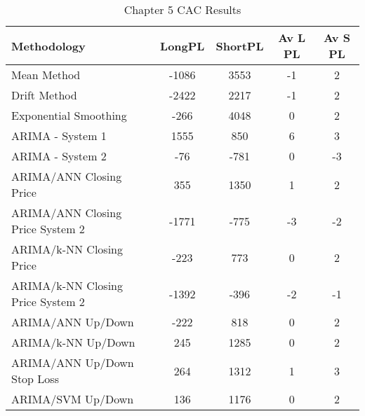 \begin{table}[ht]
\centering
\caption[Chapter 5 CAC Results]{Chapter 5 CAC Results} 
\label{tab:chp6:cac2_summary}
\begin{tabular}{lcccc}
  \toprule Methodology & LongPL & ShortPL & Av L PL & Av S PL \\ 
  \midrule Mean Method & -1086 & 3553 & -1 & 2 \\ 
  Drift Method & -2422 & 2217 & -1 & 2 \\ 
  Exponential Smoothing & -266 & 4048 & 0 & 2 \\ 
  ARIMA - System 1 & 1555 & 850 & 6 & 3 \\ 
  ARIMA - System 2 & -76 & -781 & 0 & -3 \\ 
  ARIMA/ANN Closing Price & 355 & 1350 & 1 & 2 \\ 
  ARIMA/ANN Closing Price System 2 & -1771 & -775 & -3 & -2 \\ 
  ARIMA/k-NN Closing Price & -223 & 773 & 0 & 2 \\ 
  ARIMA/k-NN Closing Price System 2 & -1392 & -396 & -2 & -1 \\ 
  ARIMA/ANN Up/Down & -222 & 818 & 0 & 2 \\ 
  ARIMA/k-NN Up/Down & 245 & 1285 & 0 & 2 \\ 
  ARIMA/ANN Up/Down Stop Loss & 264 & 1312 & 1 & 3 \\ 
  ARIMA/SVM Up/Down & 136 & 1176 & 0 & 2 \\ 
   \bottomrule \end{tabular}
\end{table}
